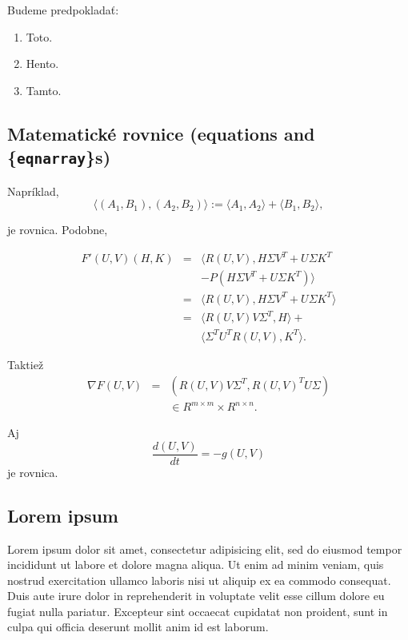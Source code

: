 \documentclass{svk_long_sk}
\begin{document}
Budeme predpokladať:
\begin{enumerate}
\item Toto.
\item Hento.
\item Tamto.
\end{enumerate}

\subsection{Matematické rovnice (equations and \{{\tt eqnarray}\}s)}

Napríklad,
\begin{equation}
\langle (A_{1},B_{1}), (A_{2},B_{2})\rangle := \langle A_{1},A_{2}\rangle 
+ \langle B_{1},B_{2}\rangle,\label{eq2.10}
\end{equation}

je rovnica. Podobne,

\begin{eqnarray}
 F'(U,V)(H,K) &=& \langle R(U,V),H\Sigma V^{T} + U\Sigma K^{T}\nonumber\\
             && - P(H\Sigma V^{T} + U\Sigma K^{T})\rangle \nonumber \\
         &=& \langle R(U,V),H\Sigma V^{T} + U\Sigma K^{T}\rangle\nonumber \\
&=& \langle R(U,V)V\Sigma^{T},H\rangle + \nonumber\\
  &&    \langle \Sigma^{T}U^{T}R(U,V),K^{T}\rangle.    \label{eq2.11}
\end{eqnarray}

Taktiež
\begin{eqnarray}
 \nabla F(U,V) &=& (R(U,V)V\Sigma^{T},R(U,V)^{T}U\Sigma )\nonumber\\
 && \in R^{m \times m} \times R^{n \times n}.   \label{eq2.12}
\end{eqnarray}

Aj
\begin{equation}
\frac{d(U,V)}{dt} = -g(U,V) 	\label{eq2.15}
\end{equation}
je rovnica.

\subsection{Lorem ipsum}

Lorem ipsum dolor sit amet, consectetur adipisicing elit, sed do eiusmod tempor incididunt ut labore et dolore magna aliqua. Ut enim ad minim veniam, quis nostrud exercitation ullamco laboris nisi ut aliquip ex ea commodo consequat. Duis aute irure dolor in reprehenderit in voluptate velit esse cillum dolore eu fugiat nulla pariatur. Excepteur sint occaecat cupidatat non proident, sunt in culpa qui officia deserunt mollit anim id est laborum.
 
\end{document}

